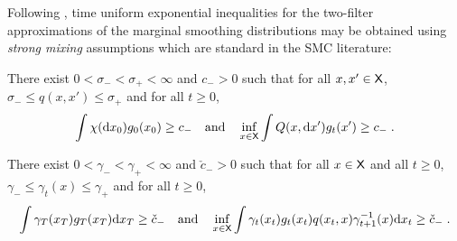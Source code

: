 \begin{rem}
Following \cite{olsson:westerborn:2015,douc:garivier:moulines:olsson:2011,dubarry:lecorff:2013}, time uniform exponential inequalities for the two-filter approximations of the marginal smoothing distributions may be obtained using {\em strong mixing} assumptions which are standard in the SMC literature:

\begin{assumptionmix}
\label{assum:mix}
There exist $0<\sigma_- < \sigma_+<\infty$ and $c_->0$ such that for all $x,x'\in\mathsf{X}$, $\sigma_- \le q(x,x')\le \sigma_+$ and for all $t\ge 0$,  \[
\int \chi (\mathrm{d} x_0)g_0(x_0)\ge c_-\quad\mbox{and}\quad\inf_{x\in\mathsf{X}}\int Q(x,\mathrm{d} x')g_t(x')\ge c_-\;.
\]
\end{assumptionmix}

\begin{assumptionmix}
\label{assum:mix:gamma}
There exist $0<\gamma_- < \gamma_+<\infty$ and $\check{c}_->0$ such that for all $x\in\mathsf{X}$ and all $t\ge0$, $\gamma_- \le \gamma_t(x)\le \gamma_+$ and for all $t\ge 0$,
\[
\int \gamma_T(x_T)g_T(x_T)\mathrm{d} x_T\ge \check{c}_- \quad\mbox{and}\quad\inf_{x\in\mathsf{X}}\int \gamma_t(x_t)g_t(x_t)q(x_t,x)\gamma_{t+1}^{-1}(x)\mathrm{d} x_t\ge \check{c}_-\;.
\]
\end{assumptionmix}


\end{rem}
